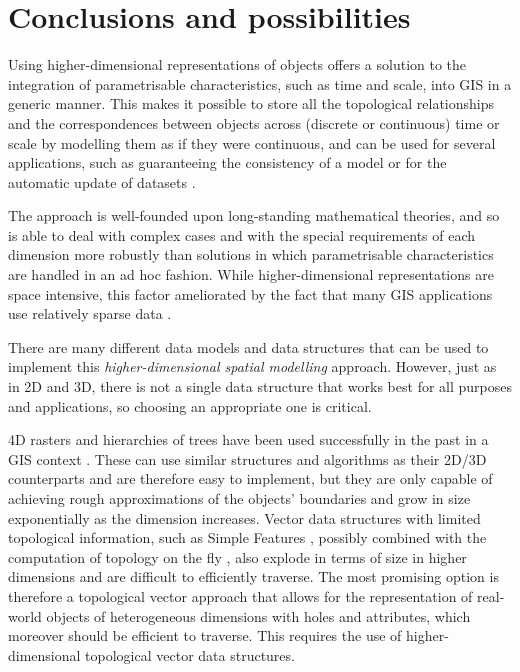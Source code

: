 \section{Conclusions and possibilities}
\label{se:nd-modelling-conclusions}

Using higher-dimensional representations of objects offers a solution to the integration of parametrisable characteristics, such as time and scale, into GIS in a generic manner.
This makes it possible to store all the topological relationships and the correspondences between objects across (discrete or continuous) time or scale by modelling them as if they were continuous, and can be used for several applications, such as guaranteeing the consistency of a model or for the automatic update of datasets \citep{vanOosterom10}.

The approach is well-founded upon long-standing mathematical theories, and so is able to deal with complex cases and with the special requirements of each dimension more robustly than solutions in which parametrisable characteristics are handled in an ad hoc fashion.
While higher-dimensional representations are space intensive, this factor ameliorated by the fact that many GIS applications use relatively sparse data \citep{McKenzie01,Mason94}.

There are many different data models and data structures that can be used to implement this \emph{higher-dimensional spatial modelling} approach.
However, just as in 2D and 3D, there is not a single data structure that works best for all purposes and applications, so choosing an appropriate one is critical.

4D rasters and hierarchies of trees have been used successfully in the past in a GIS context \citep{Mason94,Varma90,Bernard98,Oconaill92}.
These can use similar structures and algorithms as their 2D/3D counterparts and are therefore easy to implement, but they are only capable of achieving rough approximations of the objects' boundaries \citep{Blaschke10} and grow in size exponentially as the dimension increases.
Vector data structures with limited topological information, such as Simple Features \citep{SimpleFeatures1}, possibly combined with the computation of topology on the fly \citep{ESRITopology}, also explode in terms of size in higher dimensions and are difficult to efficiently traverse.
The most promising option is therefore a topological vector approach that allows for the representation of real-world objects of heterogeneous dimensions with holes and attributes, which moreover should be efficient to traverse.
This requires the use of higher-dimensional topological vector data structures.

